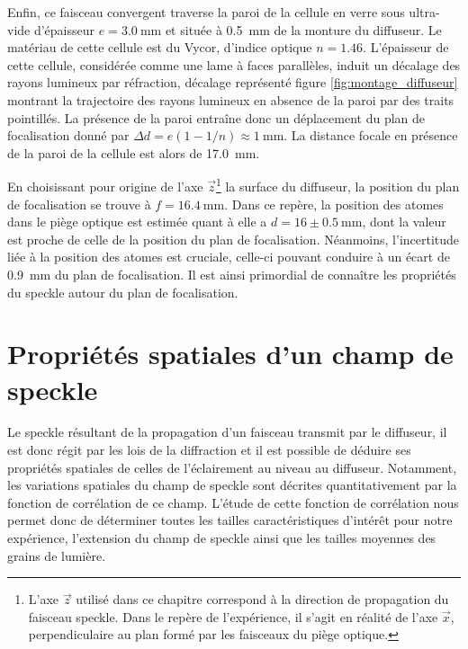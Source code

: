 Enfin, ce faisceau convergent traverse la paroi de la cellule en verre sous ultra-vide d'épaisseur $e=\SI{3.0}{\milli\metre}$ et située à \SI{0.5}{\milli\metre} de la monture du diffuseur. Le matériau de cette cellule est du Vycor, d'indice optique $n=1.46$. L'épaisseur de cette cellule, considérée comme une lame à faces parallèles, induit un décalage des rayons lumineux par réfraction, décalage représenté figure \ref{fig:montage_diffuseur} montrant la trajectoire des rayons lumineux en absence de la paroi par des traits pointillés. La présence de la paroi entraîne donc un déplacement du plan de focalisation donné par $\Delta d=e(1-1/n)\approx \SI{1}{\milli\metre}$. La distance focale en présence de la paroi de la cellule est alors de \SI{17.0}{\milli\metre}.


En choisissant pour origine de l'axe $\vec{z}$\footnote{L'axe $\vec{z}$ utilisé dans ce chapitre correspond à la direction de propagation du faisceau speckle. Dans le repère de l'expérience, il s'agit en réalité de l'axe $\vec{x}$, perpendiculaire au plan formé par les faisceaux du piège optique.} la surface du diffuseur, la position du plan de focalisation se trouve à $f=\SI{16.4}{\milli\metre}$. Dans ce repère, la position des atomes dans le piège optique est estimée quant à elle a $d=16\pm\SI{0.5}{\milli\metre}$, dont la valeur est proche de celle de la position du plan de focalisation. Néanmoins, l'incertitude liée à la position des atomes est cruciale, celle-ci pouvant conduire à un écart de \SI{0.9}{\milli\metre} du plan de focalisation. Il est ainsi primordial de connaître les propriétés du speckle autour du plan de focalisation. 









\section{Propriétés spatiales d'un champ de speckle}
\label{sc:speckle_correlation}

Le speckle résultant de la propagation d'un faisceau transmit par le diffuseur, il est donc régit par les lois de la diffraction et il est possible de déduire ses propriétés spatiales de celles de l'éclairement au niveau au diffuseur. Notamment, les variations spatiales du champ de speckle sont décrites quantitativement par la fonction de corrélation de ce champ. L'étude de cette fonction de corrélation nous permet donc de déterminer toutes les tailles caractéristiques d'intérêt pour notre expérience, l'extension du champ de speckle ainsi que les tailles moyennes des grains de lumière. 

